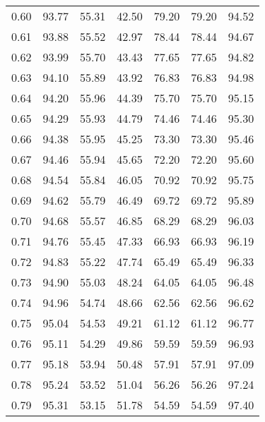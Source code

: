 \begin{tabular}{|c|c|c|c|c|c|c|}
      0.60 &     93.77 &     55.31 &      42.50 &   79.20 &      79.20 &         94.52 \\
      0.61 &     93.88 &     55.52 &      42.97 &   78.44 &      78.44 &         94.67 \\
      0.62 &     93.99 &     55.70 &      43.43 &   77.65 &      77.65 &         94.82 \\
      0.63 &     94.10 &     55.89 &      43.92 &   76.83 &      76.83 &         94.98 \\
      0.64 &     94.20 &     55.96 &      44.39 &   75.70 &      75.70 &         95.15 \\
      0.65 &     94.29 &     55.93 &      44.79 &   74.46 &      74.46 &         95.30 \\
      0.66 &     94.38 &     55.95 &      45.25 &   73.30 &      73.30 &         95.46 \\
      0.67 &     94.46 &     55.94 &      45.65 &   72.20 &      72.20 &         95.60 \\
      0.68 &     94.54 &     55.84 &      46.05 &   70.92 &      70.92 &         95.75 \\
      0.69 &     94.62 &     55.79 &      46.49 &   69.72 &      69.72 &         95.89 \\
      0.70 &     94.68 &     55.57 &      46.85 &   68.29 &      68.29 &         96.03 \\
      0.71 &     94.76 &     55.45 &      47.33 &   66.93 &      66.93 &         96.19 \\
      0.72 &     94.83 &     55.22 &      47.74 &   65.49 &      65.49 &         96.33 \\
      0.73 &     94.90 &     55.03 &      48.24 &   64.05 &      64.05 &         96.48 \\
      0.74 &     94.96 &     54.74 &      48.66 &   62.56 &      62.56 &         96.62 \\
      0.75 &     95.04 &     54.53 &      49.21 &   61.12 &      61.12 &         96.77 \\
      0.76 &     95.11 &     54.29 &      49.86 &   59.59 &      59.59 &         96.93 \\
      0.77 &     95.18 &     53.94 &      50.48 &   57.91 &      57.91 &         97.09 \\
      0.78 &     95.24 &     53.52 &      51.04 &   56.26 &      56.26 &         97.24 \\
      0.79 &     95.31 &     53.15 &      51.78 &   54.59 &      54.59 &         97.40 \\

\end{tabular}
